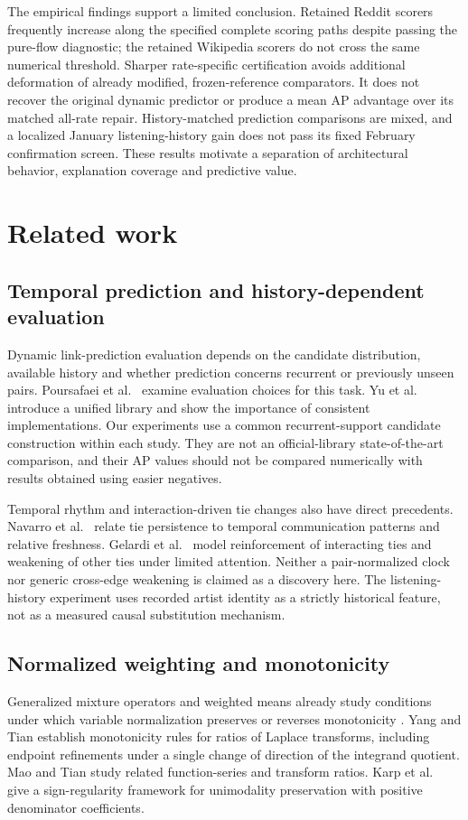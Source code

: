 \documentclass[pdflatex,sn-vancouver-num]{sn-jnl}
\theoremstyle{thmstyleone}
\begin{document}
The empirical findings support a limited conclusion. Retained Reddit scorers frequently increase along the specified complete scoring paths despite passing the pure-flow diagnostic; the retained Wikipedia scorers do not cross the same numerical threshold. Sharper rate-specific certification avoids additional deformation of already modified, frozen-reference comparators. It does not recover the original dynamic predictor or produce a mean AP advantage over its matched all-rate repair. History-matched prediction comparisons are mixed, and a localized January listening-history gain does not pass its fixed February confirmation screen. These results motivate a separation of architectural behavior, explanation coverage and predictive value.

\section{Related work}\label{sec:related}
\subsection{Temporal prediction and history-dependent evaluation}
Dynamic link-prediction evaluation depends on the candidate distribution, available history and whether prediction concerns recurrent or previously unseen pairs. Poursafaei et al.\ \cite{evaluation} examine evaluation choices for this task. Yu et al.\ \cite{dyglib} introduce a unified library and show the importance of consistent implementations. Our experiments use a common recurrent-support candidate construction within each study. They are not an official-library state-of-the-art comparison, and their AP values should not be compared numerically with results obtained using easier negatives.

Temporal rhythm and interaction-driven tie changes also have direct precedents. Navarro et al.\ \cite{cadence} relate tie persistence to temporal communication patterns and relative freshness. Gelardi et al.\ \cite{competition} model reinforcement of interacting ties and weakening of other ties under limited attention. Neither a pair-normalized clock nor generic cross-edge weakening is claimed as a discovery here. The listening-history experiment uses recorded artist identity as a strictly historical feature, not as a measured causal substitution mechanism.

\subsection{Normalized weighting and monotonicity}
Generalized mixture operators and weighted means already study conditions under which variable normalization preserves or reverses monotonicity \cite{mixture,weighted}. Yang and Tian \cite{ratio} establish monotonicity rules for ratios of Laplace transforms, including endpoint refinements under a single change of direction of the integrand quotient. Mao and Tian \cite{series} study related function-series and transform ratios. Karp et al.\ \cite{karp} give a sign-regularity framework for unimodality preservation with positive denominator coefficients.
\end{document}
